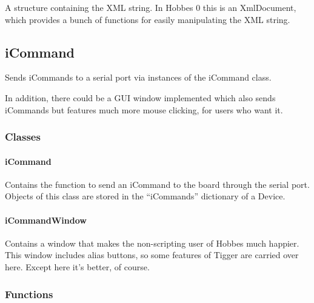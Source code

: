 \documentclass[12pt,letterpaper]{article}
\begin{document}
A structure containing the XML string. In Hobbes 0 this is an XmlDocument, which provides a bunch of functions for easily manipulating the XML string.



%
%
\subsection{iCommand}
\label{4.5}

Sends iCommands to a serial port via instances of the iCommand class.

In addition, there could be a GUI window implemented which also sends iCommands but features much more mouse clicking, for users who want it.

\setcounter{subsubsection}{-1}



%
%
\subsubsection{Classes}
\label{4.5.0}

\setcounter{paragraph}{-1}



%
%
\paragraph{iCommand}
\label{4.5.0.0}

Contains the function to send an iCommand to the board through the serial port. Objects of this class are stored in the ``iCommands'' dictionary of a Device.



%
%
\paragraph{iCommandWindow}
\label{4.5.0.1}

Contains a window that makes the non-scripting user of Hobbes much happier. This window includes alias buttons, so some features of Tigger are carried over here. Except here it's better, of course.



%
%
\subsubsection{Functions}
\label{4.5.1}

\setcounter{paragraph}{-1}
\end{document}
